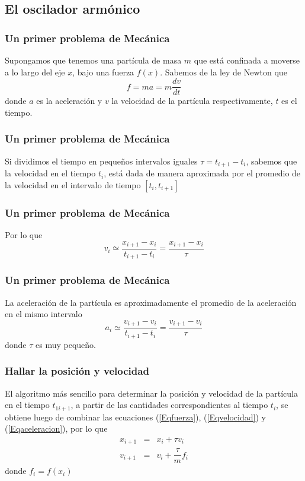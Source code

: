 \subsection{El oscilador armónico}
\begin{frame}
\frametitle{Un primer problema de Mecánica}
Supongamos que tenemos una partícula de masa $m$ que está confinada a moverse a lo largo del eje $x$, bajo una fuerza $f(x)$. Sabemos de la ley de Newton que
\begin{equation}\label{Eqfuerza}
f = ma = m \dfrac{dv}{dt}
\end{equation}
donde $a$ es la aceleración y $v$ la velocidad de la partícula respectivamente, $t$ es el tiempo.
\end{frame}
\begin{frame}
\frametitle{Un primer problema de Mecánica}
Si dividimos el tiempo en pequeños intervalos iguales $\tau = t_{i + 1} - t_{i}$, sabemos que la velocidad en el tiempo $t_{i}$, está dada de manera aproximada por el promedio de la velocidad en el intervalo de tiempo $[t_{i}, t_{i + 1}]$
\end{frame}
\begin{frame}
\frametitle{Un primer problema de Mecánica}
Por lo que
\begin{equation}\label{Eqvelocidad}
v_{i} \simeq \dfrac{x_{i+1}-x_{i}}{t_{i+1}-t_{i}} = \dfrac{x_{i+1}-x_{i}}{\tau}
\end{equation}
\end{frame}
\begin{frame}
\frametitle{Un primer problema de Mecánica}
La aceleración de la partícula es aproximadamente el promedio de la aceleración en el mismo intervalo
\begin{equation}\label{Eqaceleracion}
a_{i} \simeq \dfrac{v_{i+1}-v_{i}}{t_{i+1}-t_{i}} = \dfrac{v_{i+1}-v_{i}}{\tau}
\end{equation}
donde $\tau$ es muy pequeño.
\end{frame}
\begin{frame}
\frametitle{Hallar la posición y velocidad}
El algoritmo más sencillo para determinar la posición y velocidad de la partícula en el tiempo $t_{1i+1}$, a partir de las cantidades correspondientes al tiempo $t_{i}$, se obtiene luego de combinar las ecuaciones (\ref{Eqfuerza}), (\ref{Eqvelocidad}) y (\ref{Eqaceleracion}), por lo que
\begin{eqnarray}
x_{i+1} &=& x_{i} + \tau v_{i} \label{Eqposicion} \\
v_{i+1} &=& v_{i} + \dfrac{\tau}{m} f_{i} \label{Eqvelocidadr}
\end{eqnarray}
donde $f_{i} = f(x_{i})$
\end{frame}
